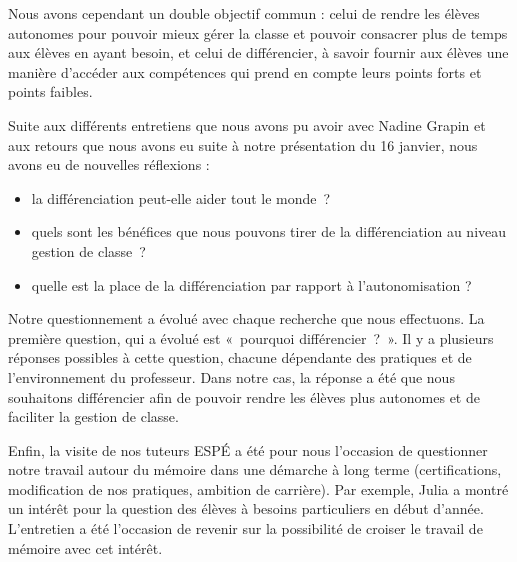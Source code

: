   Nous avons cependant un double objectif commun : celui de rendre les élèves autonomes pour pouvoir mieux gérer la classe et pouvoir consacrer plus de temps aux élèves en ayant besoin, et celui de différencier, à savoir fournir aux élèves une manière d’accéder aux compétences qui prend en compte leurs points forts et points faibles.

  Suite aux différents entretiens que nous avons pu avoir avec Nadine Grapin et aux retours que nous avons eu suite à notre présentation du 16 janvier, nous avons eu de nouvelles réflexions :
  \begin{itemize}
      \item la différenciation peut-elle aider tout le monde ?
      \item quels sont les bénéfices que nous pouvons tirer de la différenciation au niveau gestion de classe ?
      \item quelle est la place de la différenciation par rapport à l’autonomisation ?
  \end{itemize}

Notre questionnement a évolué avec chaque recherche que nous effectuons. La première question, qui a évolué est « pourquoi différencier ? ». Il y a plusieurs réponses possibles à cette question, chacune dépendante des pratiques et de l’environnement du professeur. Dans notre cas, la réponse a été que nous souhaitons différencier afin de pouvoir rendre les élèves plus autonomes et de faciliter la gestion de classe.

Enfin, la visite de nos tuteurs ESPÉ a été pour nous l’occasion de questionner notre travail autour du mémoire dans une démarche à long terme (certifications, modification de nos pratiques, ambition de carrière). Par exemple, Julia a montré un intérêt pour la question des élèves à besoins particuliers en début d’année. L’entretien a été l’occasion de revenir sur la possibilité de croiser le travail de mémoire avec cet intérêt.

